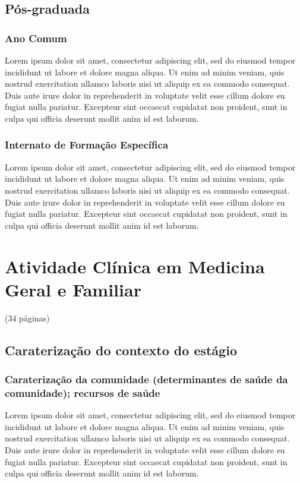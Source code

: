 \documentclass{report}
\begin{document}
\section{Pós-graduada}

\subsection{Ano Comum}
Lorem ipsum dolor sit amet, consectetur adipiscing elit, sed do eiusmod tempor incididunt ut labore et dolore magna aliqua. Ut enim ad minim veniam, quis nostrud exercitation ullamco laboris nisi ut aliquip ex ea commodo consequat. Duis aute irure dolor in reprehenderit in voluptate velit esse cillum dolore eu fugiat nulla pariatur. Excepteur sint occaecat cupidatat non proident, sunt in culpa qui officia deserunt mollit anim id est laborum.

\subsection{Internato de Formação Específica}
Lorem ipsum dolor sit amet, consectetur adipiscing elit, sed do eiusmod tempor incididunt ut labore et dolore magna aliqua. Ut enim ad minim veniam, quis nostrud exercitation ullamco laboris nisi ut aliquip ex ea commodo consequat. Duis aute irure dolor in reprehenderit in voluptate velit esse cillum dolore eu fugiat nulla pariatur. Excepteur sint occaecat cupidatat non proident, sunt in culpa qui officia deserunt mollit anim id est laborum.

\chapter{Atividade Clínica em Medicina Geral e Familiar}
(34 páginas)

\section{Caraterização do contexto do estágio}
\subsection{Caraterização da comunidade (determinantes de saúde da comunidade); recursos de saúde}
Lorem ipsum dolor sit amet, consectetur adipiscing elit, sed do eiusmod tempor incididunt ut labore et dolore magna aliqua. Ut enim ad minim veniam, quis nostrud exercitation ullamco laboris nisi ut aliquip ex ea commodo consequat. Duis aute irure dolor in reprehenderit in voluptate velit esse cillum dolore eu fugiat nulla pariatur. Excepteur sint occaecat cupidatat non proident, sunt in culpa qui officia deserunt mollit anim id est laborum.
\end{document}
